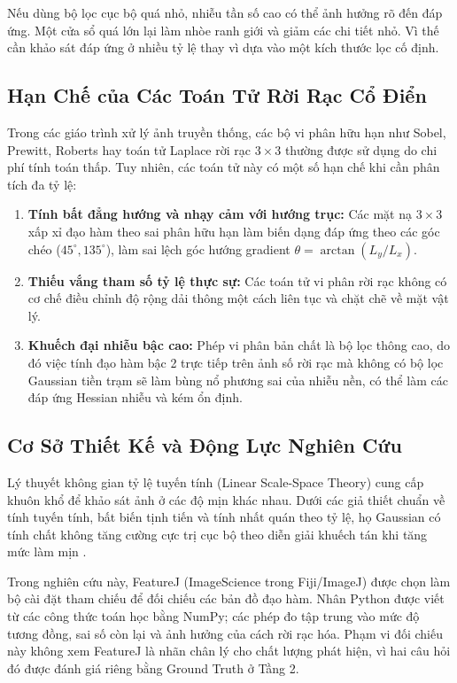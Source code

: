 \documentclass[conference]{IEEEtran}
\begin{document}
Nếu dùng bộ lọc cục bộ quá nhỏ, nhiễu tần số cao có thể ảnh hưởng rõ đến đáp ứng. Một cửa sổ quá lớn lại làm nhòe ranh giới và giảm các chi tiết nhỏ. Vì thế cần khảo sát đáp ứng ở nhiều tỷ lệ thay vì dựa vào một kích thước lọc cố định.

\subsection{Hạn Chế của Các Toán Tử Rời Rạc Cổ Điển}
Trong các giáo trình xử lý ảnh truyền thống, các bộ vi phân hữu hạn như Sobel, Prewitt, Roberts hay toán tử Laplace rời rạc $3 \times 3$ thường được sử dụng do chi phí tính toán thấp. Tuy nhiên, các toán tử này có một số hạn chế khi cần phân tích đa tỷ lệ:
\begin{enumerate}
    \item \textbf{Tính bất đẳng hướng và nhạy cảm với hướng trục:} Các mặt nạ $3 \times 3$ xấp xỉ đạo hàm theo sai phân hữu hạn làm biến dạng đáp ứng theo các góc chéo ($45^\circ, 135^\circ$), làm sai lệch góc hướng gradient $\theta = \arctan(L_y / L_x)$.
    \item \textbf{Thiếu vắng tham số tỷ lệ thực sự:} Các toán tử vi phân rời rạc không có cơ chế điều chỉnh độ rộng dải thông một cách liên tục và chặt chẽ về mặt vật lý.
    \item \textbf{Khuếch đại nhiễu bậc cao:} Phép vi phân bản chất là bộ lọc thông cao, do đó việc tính đạo hàm bậc 2 trực tiếp trên ảnh số rời rạc mà không có bộ lọc Gaussian tiền trạm sẽ làm bùng nổ phương sai của nhiễu nền, có thể làm các đáp ứng Hessian nhiễu và kém ổn định.
\end{enumerate}

\subsection{Cơ Sở Thiết Kế và Động Lực Nghiên Cứu}
Lý thuyết không gian tỷ lệ tuyến tính (Linear Scale-Space Theory) cung cấp khuôn khổ để khảo sát ảnh ở các độ mịn khác nhau. Dưới các giả thiết chuẩn về tính tuyến tính, bất biến tịnh tiến và tính nhất quán theo tỷ lệ, họ Gaussian có tính chất không tăng cường cực trị cục bộ theo diễn giải khuếch tán khi tăng mức làm mịn \cite{witkin1983scale,lindeberg1994scale}.

Trong nghiên cứu này, FeatureJ (ImageScience trong Fiji/ImageJ) được chọn làm bộ cài đặt tham chiếu để đối chiếu các bản đồ đạo hàm. Nhân Python được viết từ các công thức toán học bằng NumPy; các phép đo tập trung vào mức độ tương đồng, sai số còn lại và ảnh hưởng của cách rời rạc hóa. Phạm vi đối chiếu này không xem FeatureJ là nhãn chân lý cho chất lượng phát hiện, vì hai câu hỏi đó được đánh giá riêng bằng Ground Truth ở Tầng 2.
\end{document}
